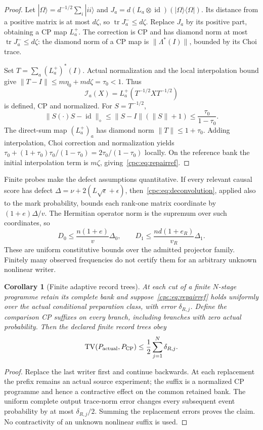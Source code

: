 \documentclass[11pt,oneside,openany]{book}
\newtheorem{corollary}[theorem]{Corollary}
\theoremstyle{definition}
\theoremstyle{remark}\newtheorem{remark}[theorem]{Remark}
\begin{document}
\begin{proof}
Let $|\Omega\rangle=d^{-1/2}\sum_i|ii\rangle$ and $J_a=d(L_a\otimes\operatorname{id})(|\Omega\rangle\langle\Omega|)$. Its distance from a positive matrix is at most $d\zeta$, so $\operatorname{tr}J_a^-\le d\zeta$. Replace $J_a$ by its positive part, obtaining a CP map $L_a^+$. The correction is CP and has diamond norm at most $\operatorname{tr}J_a^-\le d\zeta$: the diamond norm of a CP map is $\|\Lambda^*(I)\|$, bounded by its Choi trace.

Set $T=\sum_a(L_a^+)^*(I)$. Actual normalization and the local interpolation bound give $\|T-I\|\le m\eta_0+md\zeta=\tau_0<1$. Thus
\[
 \mathcal I_a(X)=L_a^+(T^{-1/2}XT^{-1/2})
\]
is defined, CP and normalized. For $S=T^{-1/2}$,
\[
 \|S(\cdot)S-\operatorname{id}\|_\diamond
 \le\|S-I\|(\|S\|+1)\le\frac{\tau_0}{1-\tau_0}.
\]
The direct-sum map $(L_a^+)_a$ has diamond norm $\|T\|\le1+\tau_0$. Adding interpolation, Choi correction and normalization yields
$\tau_0+(1+\tau_0)\tau_0/(1-\tau_0)=2\tau_0/(1-\tau_0)$ locally. On the reference bank the initial interpolation term is $m\zeta$, giving~\eqref{cpc:eq:repairref}.
\end{proof}

Finite probes make the defect assumptions quantitative. If every relevant causal score has defect $\Delta=\nu+2(L\sqrt\epsilon+\epsilon)$, then~\eqref{cpc:eq:deconvolution}, applied also to the mark probability, bounds each rank-one matrix coordinate by $(1+e)\Delta/v$. The Hermitian operator norm is the supremum over such coordinates, so
\begin{equation}
 D_0\le\frac{n(1+e)}{v}\Delta_0,\qquad
 D_1\le\frac{nd(1+e_R)}{v_R}\Delta_1.
 \label{cpc:eq:finiteprobeerrors}
\end{equation}
These are uniform constitutive bounds over the admitted projector family. Finitely many observed frequencies do not certify them for an arbitrary unknown nonlinear writer.

\begin{corollary}[Finite adaptive record trees]
\label{cpc:cor:tree}
At each cut of a finite $N$-stage programme retain its complete bank and suppose~\eqref{cpc:eq:repairref} holds uniformly over the actual conditional preparation class, with error $\delta_{R,j}$. Define the comparison CP suffixes on every branch, including branches with zero actual probability. Then the declared finite record trees obey
\begin{equation}
 \operatorname{TV}(P_{\rm actual},P_{\rm CP})\le\frac12\sum_{j=1}^N\delta_{R,j}.
 \label{cpc:eq:treeerror}
\end{equation}
\end{corollary}
\begin{proof}
Replace the last writer first and continue backwards. At each replacement the prefix remains an actual source experiment; the suffix is a normalized CP programme and hence a contractive effect on the common retained bank. The uniform complete output trace-norm error changes every subsequent event probability by at most $\delta_{R,j}/2$. Summing the replacement errors proves the claim. No contractivity of an unknown nonlinear suffix is used.
\end{proof}
\end{document}
